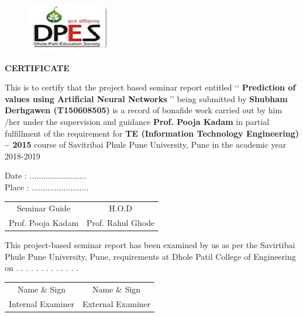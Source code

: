 \documentclass[12pt,times,a4paper]{report}
\begin{document}


\begin{titlepage}
\begin{center} 
\begin{figure}[h]

\centerline{\includegraphics[scale=0.8]{logo1}}

\end{figure}


\vspace*{0.1in}
{\fontsize{16}{12}\textbf{{CERTIFICATE}} }\\
\begin{enumerate}
\vspace{0.3in}
This is to certify that the project based seminar report entitled \lq\lq \textbf{ Prediction of values using Artificial Neural Networks}
 \rq\rq
being submitted by \textbf{ Shubham Derhgawen (T150608505)}  is a record of bonafide work carried out by him
/her under the supervision and guidance\textbf{ Prof. Pooja Kadam } in partial fulfillment of the
requirement for \textbf{ TE (Information Technology Engineering) – 2015} course of Savitribai Phule
Pune University, Pune in the academic year 2018-2019

\vspace*{0.3in}
Date  : .........................  \\ 
Place : .........................  \\ 
 
\vspace{0.8in}
\begin{table} [h]
\addtolength{\tabcolsep}{65pt}
\begin{tabular}{c                c  }
Seminar Guide  & H.O.D \\
 Prof. Pooja Kadam  & Prof. Rahul Ghode 
\end{tabular}
\end{table}
\vspace{0.8in}
\hrulefill

This project-based seminar report has been examined by us as per the Savirtibai Phule Pune
University, Pune, requirements at Dhole Patil College of Engineering on . . . . . . . . . . . . .
\vspace{0.6in}
\begin{table} [h]
\addtolength{\tabcolsep}{65pt}
\begin{tabular}{c                c  }
Name \& Sign  & Name \& Sign \\
 Internal Examiner   & External Examiner 
\end{tabular}
\end{table}
\end{enumerate}
\end{center}

\end{titlepage}
\end{document}
